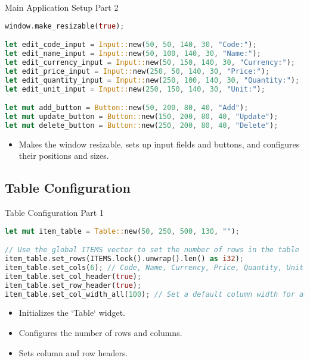 \documentclass[aspectratio=169, table]{beamer}
\begin{document}
\begin{frame}[fragile]{Main Application Setup Part 2}
\vspace{15pt}
\begin{lstlisting}[language=Rust]
window.make_resizable(true);

let edit_code_input = Input::new(50, 50, 140, 30, "Code:");
let edit_name_input = Input::new(50, 100, 140, 30, "Name:");
let edit_currency_input = Input::new(50, 150, 140, 30, "Currency:");
let edit_price_input = Input::new(250, 50, 140, 30, "Price:");
let edit_quantity_input = Input::new(250, 100, 140, 30, "Quantity:");
let edit_unit_input = Input::new(250, 150, 140, 30, "Unit:");

let mut add_button = Button::new(50, 200, 80, 40, "Add");
let mut update_button = Button::new(150, 200, 80, 40, "Update");
let mut delete_button = Button::new(250, 200, 80, 40, "Delete");
\end{lstlisting}

\begin{itemize}
\item Makes the window resizable, sets up input fields and buttons, and configures their positions and sizes.
\end{itemize}
\end{frame}

\subsection{Table Configuration}
\begin{frame}[fragile]{Table Configuration Part 1}
\begin{lstlisting}[language=Rust]
let mut item_table = Table::new(50, 250, 500, 130, "");

// Use the global ITEMS vector to set the number of rows in the table
item_table.set_rows(ITEMS.lock().unwrap().len() as i32);
item_table.set_cols(6); // Code, Name, Currency, Price, Quantity, Unit
item_table.set_col_header(true);
item_table.set_row_header(true);
item_table.set_col_width_all(100); // Set a default column width for all columns
\end{lstlisting}

\begin{itemize}
\item Initializes the `Table` widget.
\item Configures the number of rows and columns.
\item Sets column and row headers.
\end{itemize}
\end{frame}
\end{document}
